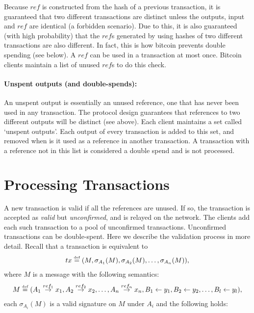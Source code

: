 \documentclass[]{report}   %
\newcommand{\sr}{\stackrel}
\newcommand{\ra}{\rightarrow}
\newcommand{\la}{\leftarrow}
\newcommand{\defined}{\stackrel{\mbox{\tiny{def}}}{=}}
\begin{document}
Because $ref$ is constructed from the hash of a previous transaction, it is guaranteed that two different transactions are distinct unless the outputs, input and $ref$ are identical (a forbidden scenario). Due to this, it is also guaranteed (with high probability) that the $ref$s generated by using hashes of two different transactions are also different. In fact, this is how bitcoin prevents double spending (see below). A $ref$ can be used in a transaction at most once. Bitcoin clients maintain a list of unused $ref$s to do this check.

\paragraph{Unspent outputs (and double-spends):} An unspent output is essentially an unused reference, one that has never been used in any transaction. The protocol design guarantees that references to two different outputs will be distinct (see above).
Each client maintains a set called `unspent outputs'. Each output of every transaction is added to this set, and removed when is it used as a reference in another transaction. A transaction with a reference not in this list is considered a double spend and is not processed. %


\section{Processing Transactions}


A new transaction is valid if all the references are unused. If so, the transaction is accepted as {\em valid} but {\em unconfirmed}, and is relayed on the network. The clients add each such transaction to a pool of unconfirmed transactions. Unconfirmed transactions can be double-spent. Here we describe the validation process in more detail.
Recall that a transaction is equivalent to 
$$tx\defined (M, \sigma_{A_1}(M), \sigma_{A_2}(M), \ldots, \sigma_{A_n}(M)),$$ 
where $M$ is a message with the following semantics:
\[
M \defined (A_1\sr{ref_1}{\ra}x_1, A_2\sr{ref_2}{\ra}x_2, \ldots, A_n\sr{ref_n}{\ra}x_n, B_1\la y_1,
B_2\la y_2, \ldots, B_l\la y_l), 
\] 
each $\sigma_{A_i}(M)$ is a valid signature on $M$ under $A_i$ and the following holds:
\end{document}
